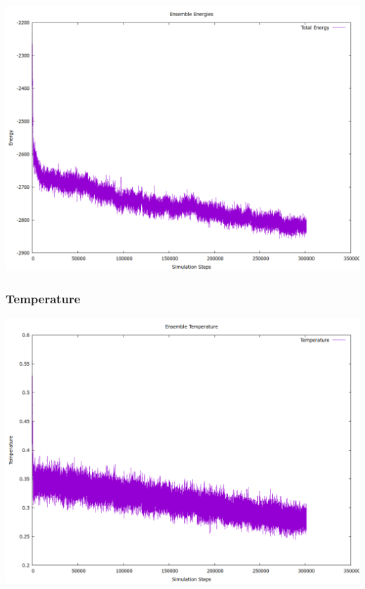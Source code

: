 \documentclass[a4paper,11pt,twoside]{article}
\begin{document}
\begin{center}
\includegraphics[width=.9\linewidth]{../../runs/nvt_cool_sample/plots/N_501_T_0.28/te.png}
\end{center}
\subsubsection{Temperature}
\label{sec:org0052518}
\begin{center}
\includegraphics[width=.9\linewidth]{../../runs/nvt_cool_sample/plots/N_501_T_0.28/temperature.png}
\end{center}
\end{document}
